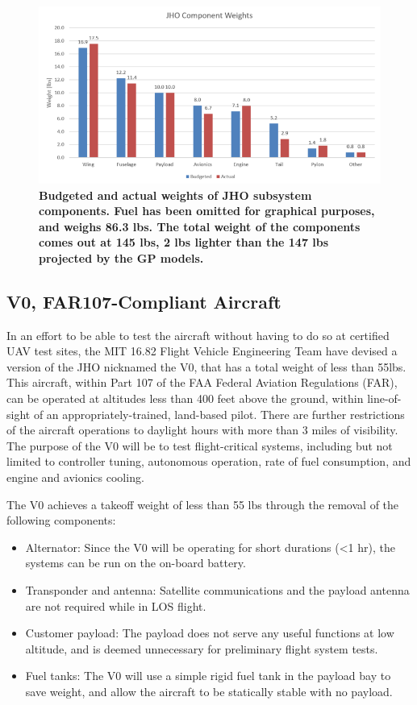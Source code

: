 \documentclass[journal]{aiaa-tc}%
\begin{document}
\begin{figure}[H]
    \begin{center}
    \includegraphics[width = .65\textwidth]{WeightBreakdown}
     \caption{ \textbf{Budgeted and actual weights of JHO subsystem components. Fuel has been omitted for graphical purposes, and weighs 86.3 lbs. The total weight of the components comes out at 145 lbs, 2 lbs lighter than the 147 lbs projected by the GP models.} }
    \label{f:weightBudget}
    \end{center}
\end{figure}

\subsection{V0, FAR107-Compliant Aircraft}

In an effort to be able to test the aircraft without having to do so at certified UAV test sites, the MIT 16.82 Flight Vehicle Engineering Team have devised a version of the JHO nicknamed the V0, that has a total weight of less than 55lbs. This aircraft, within Part 107 of the FAA Federal Aviation Regulations (FAR), can be operated at altitudes less than 400 feet above the ground, within line-of-sight of an appropriately-trained, land-based pilot. There are further restrictions of the aircraft operations to daylight hours with more than 3 miles of visibility. The purpose of the V0 will be to test flight-critical systems, including but not limited to controller tuning, autonomous operation, rate of fuel consumption, and engine and avionics cooling. 

The V0 achieves a takeoff weight of less than 55 lbs through the removal of the following components:
\begin{itemize}
	\item Alternator: Since the V0 will be operating for short durations (<1 hr), the systems can be run on the on-board battery. 
	\item Transponder and antenna: Satellite communications and the payload antenna are not required while in LOS flight. 
	\item Customer payload: The payload does not serve any useful functions at low altitude, and is deemed unnecessary for preliminary flight system tests. 
	\item Fuel tanks: The V0 will use a simple rigid fuel tank in the payload bay to save weight, and allow the aircraft to be statically stable with no payload. 
\end{itemize}
\end{document}
